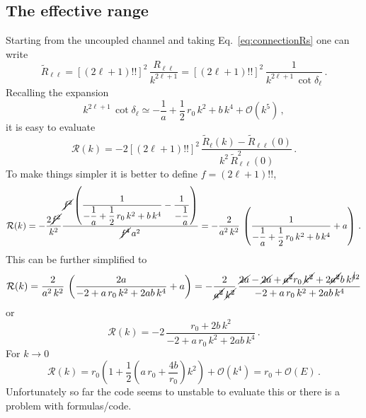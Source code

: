 \documentclass[10pt,a4paper]{article}
\newcommand{\eq}[1]{Eq.~#1}
\begin{document}
		
		
		
	\subsection{The effective range}
	Starting from the uncoupled channel and taking \eq{\eqref{eq:connectionRs}} one can write
	\begin{equation}
		\tilde{R}_{\ell\ell}=
		\left[(2\ell+1)!!\right]^2\,
		\frac{R_{\ell\ell}}{k^{2\ell+1}}
		=
		\left[(2\ell+1)!!\right]^2\,
		\frac{1}{k^{2\ell+1}\,\cot \delta_\ell}
		\,.
	\end{equation}
	Recalling the expansion
	\begin{equation}
		k^{2\ell+1}\,\cot \delta_\ell \simeq 
		-\frac{1}{a} + \frac{1}{2}\,r_0\,k^2
		+ b\,k^4 +\mathcal{O}(k^5)\,,
	\end{equation}
	it is easy to evaluate
	\begin{equation}
		\mathcal{R}(k)=-2\left[(2\ell+1)!!\right]^2\,\frac{\tilde{R}_{\ell}(k)-\tilde{R}_{\ell\ell}(0)}{k^2\,\tilde{R}_{\ell\ell}^2(0)}\,.
	\end{equation}
	To make things simpler it is better to define $f=(2\ell+1)!!$, 
	\begin{equation}
		\mathcal{R}(k)
		=
		-\frac{2\cancel{f^2}}{k^2}\frac{\cancel{f^2}\left(\dfrac{1}{-\dfrac{1}{a} + \dfrac{1}{2}\,r_0\,k^2
		+ b\,k^4}-\dfrac{1}{-\dfrac{1}{a}}\right)}{\cancel{f^4}\,a^2}
		=
		-\frac{2}{a^2\,k^2}\,\left(
		\dfrac{1}{-\dfrac{1}{a} + \dfrac{1}{2}\,r_0\,k^2
			+ b\,k^4} +a
		\right)\,.
	\end{equation}
	This can be further simplified to
	\begin{equation}
		\mathcal{R}(k)=
		\frac{2}{a^2\,k^2}\,\left(
		\frac{2a}{-2+a\,r_0\,k^2+2ab\,k^4}
			+ a
		\right)
		=
		-\frac{2}{\cancel{a^2}\,\cancel{k^2}}\,
		\frac{\cancel{2a}-\cancel{2a}+\cancel{a^2}r_0\,\cancel{k^2}+2\cancel{a^2}b\,k^{\cancel{4}2}}{-2+a\,r_0\,k^2+2ab\,k^4}
	\end{equation}
	or
	\begin{equation}
		\mathcal{R}(k)
		=
		-2\,
		\frac{r_0+2b\,k^2}{-2+a\,r_0\,k^2+2ab\,k^4}\,.
	\end{equation}
	For $k\rightarrow 0$ 
	\begin{equation}
		\mathcal{R}(k)= r_0\left(1+ \frac{1}{2}\left(a\,r_0+\frac{4b}{r_0}\right)k^2\right) +\mathcal{O}(k^4) = r_0 +\mathcal{O}(E)\,.
	\end{equation}
	Unfortunately so far the code seems to unstable to evaluate this or there is a problem with formulas/code.
	
\end{document}
